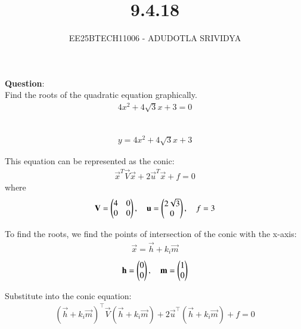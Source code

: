 \documentclass[journal]{IEEEtran}
\begin{document}

\vspace{3cm}

\title{9.4.18}
\author{EE25BTECH11006 - ADUDOTLA SRIVIDYA}
\maketitle
    {\let\newpage\relax\maketitle}

\renewcommand{\thefigure}{\theenumi}
\renewcommand{\thetable}{\theenumi}
\setlength{\intextsep}{10pt} %

\renewcommand{\thetable}{\theenumi}

\textbf{Question}: \\
Find the roots of the quadratic equation graphically.
\begin{align}
4x^2 + 4\sqrt{3}x + 3 = 0
\end{align}

\solution \\

\begin{align}
y = 4x^2 + 4\sqrt{3}x + 3
\end{align}

This equation can be represented as the conic:
\begin{align}
\vec{x}^T\vec{V}\vec{x} + 2\vec{u}^T\vec{x} + f = 0
\end{align}
where
\begin{align}
\mathbf{V} = \begin{pmatrix}4 & 0 \\ 0 & 0\end{pmatrix}, \quad \mathbf{u} = \begin{pmatrix}2\sqrt{3} \\ 0\end{pmatrix}, \quad f = 3
\end{align}

To find the roots, we find the points of intersection of the conic with the x-axis:
\begin{align}
\vec{x} = \vec{h} + k_i\vec{m}    
\end{align}
\begin{align}
\mathbf{h}=\begin{pmatrix}0 \\ 0\end{pmatrix}, \quad \mathbf{m} = \begin{pmatrix}1 \\ 0\end{pmatrix}
\end{align}

Substitute into the conic equation:
\begin{align}
(\vec{h} + k_i \vec{m})^{\top} \vec{V} (\vec{h} + k_i \vec{m}) + 2\vec{u}^{\top} (\vec{h} + k_i \vec{m}) + f = 0
\end{align}
\end{document}
